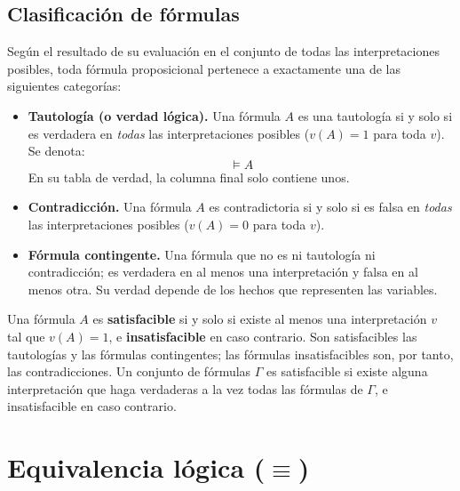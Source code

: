 \subsection{Clasificación de fórmulas}

Según el resultado de su evaluación en el conjunto de todas las interpretaciones posibles, toda fórmula proposicional pertenece a exactamente una de las siguientes categorías:

\begin{itemize}
    \item \textbf{Tautología (o verdad lógica).} Una fórmula $A$ es una tautología si y solo si es verdadera en \emph{todas} las interpretaciones posibles ($v(A) = 1$ para toda $v$). Se denota:
    \[
    \models A
    \]
    En su tabla de verdad, la columna final solo contiene unos.
    \item \textbf{Contradicción.} Una fórmula $A$ es contradictoria si y solo si es falsa en \emph{todas} las interpretaciones posibles ($v(A) = 0$ para toda $v$).
    \item \textbf{Fórmula contingente.} Una fórmula que no es ni tautología ni contradicción; es verdadera en al menos una interpretación y falsa en al menos otra. Su verdad depende de los hechos que representen las variables.
\end{itemize}

\begin{definition}[Satisfacibilidad]
Una fórmula $A$ es \textbf{satisfacible} si y solo si existe al menos una interpretación $v$ tal que $v(A) = 1$, e \textbf{insatisfacible} en caso contrario. Son satisfacibles las tautologías y las fórmulas contingentes; las fórmulas insatisfacibles son, por tanto, las contradicciones.
Un conjunto de fórmulas $\Gamma$ es satisfacible si existe alguna
interpretación que haga verdaderas a la vez todas las fórmulas de $\Gamma$, e insatisfacible en caso contrario.
\end{definition}


\section{Equivalencia lógica (\texorpdfstring{$\equiv$}{equivalencia})}

